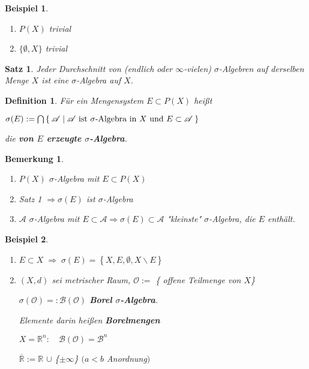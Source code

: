 \documentclass[11pt]{memoir}
\theoremstyle{changebreak}
\newtheorem{Definition}{Definition}[chapter]
\newtheorem{Bemerkung}{Bemerkung}[chapter]
\newtheorem{Beispiel}{Beispiel}[chapter]
\newtheorem{Satz}{Satz}[chapter]
\begin{document}
\begin{Beispiel}
\begin{enumerate}
	\item $P(X)$\; trivial
	\item $\{ \emptyset, X \}$\; trivial
\end{enumerate}
\end{Beispiel}

\begin{Satz}
Jeder Durchschnitt von (endlich oder $\infty$-vielen) $\sigma$-Algebren auf derselben Menge $X$ ist eine $\sigma$-Algebra auf $X$.
\end{Satz}

\begin{Definition}
Für ein Mengensystem $E \subset P(X)$ heißt 
\begin{center}
$\sigma(E):=\bigcap \Set{\mathscr{A}| \mathscr{A} \text{ ist } \sigma\text{-Algebra in }X\text{ und } E \subset \mathscr{A} }$
\end{center}
die \textbf{von $E$ erzeugte $\sigma$-Algebra}.
\end{Definition}

\begin{Bemerkung}
\begin{enumerate}
	\item $P(X)$ $\sigma$-Algebra mit $E \subset P(X)$
	\item Satz 1 $\Rightarrow \sigma(E)$ ist $\sigma$-Algebra
	\item $\mathscr{A}$ $\sigma$-Algebra mit $E \subset \mathscr{A} \Rightarrow \sigma(E) \subset 		\mathscr{A}$ "kleinste"\; $\sigma$-Algebra, die $E$ enthält.
\end{enumerate}
\end{Bemerkung}

\begin{Beispiel}
\begin{enumerate}
	\item $E \subset X \; \Rightarrow \; \sigma(E) = \left\{X, E, \emptyset, X \backslash E\right\}$
	\item $(X, d)$ sei metrischer Raum, $\mathscr{O}:=$ \{ offene Teilmenge von $X$\} 
	\begin{center}
		$\sigma(\mathscr{O})=:\mathscr{B(O)}$ \quad \textbf{Borel $\sigma$-Algebra}. 
	\end{center}
	Elemente darin heißen  \textbf{Borelmengen} 
	\par
	$X = \mathbb{R}^{n}: \quad \mathscr{B(O)} = \mathscr{B}^{n}$ 
	\par
	$\overline{\mathbb{R}} := \mathbb{R}$  $\cup$ \{$\pm\infty$\} \quad $(a < b$ Anordnung$)$
\end{enumerate}
\end{Beispiel}
\end{document}
